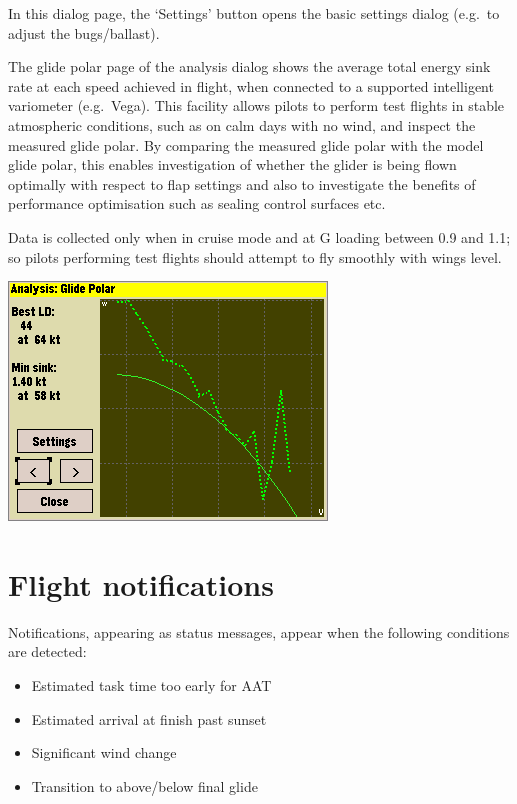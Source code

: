 \documentclass[a4paper,12pt]{refrep}
\begin{document}
In this dialog page, the `Settings' button opens the basic settings
dialog (e.g.\ to adjust the bugs/ballast).

The glide polar page of the analysis dialog shows the average total
energy sink rate at each speed achieved in flight, when connected to a
supported intelligent variometer (e.g.\ Vega).  This facility allows
pilots to perform test flights in stable atmospheric conditions, such
as on calm days with no wind, and inspect the measured glide polar.
By comparing the measured glide polar with the model glide polar, this
enables investigation of whether the glider is being flown optimally
with respect to flap settings and also to investigate the benefits of
performance optimisation such as sealing control surfaces etc.

Data is collected only when in cruise mode and at G loading between
0.9 and 1.1; so pilots performing test flights should attempt to fly
smoothly with wings level.

\begin{center}
\includegraphics[angle=0,width=\linewidth,keepaspectratio='true']{figures/shot-glidepolar.png}
\end{center}

\section{Flight notifications}

 Notifications, appearing as status messages, appear when the
 following conditions are detected: 
\begin{itemize}
\item Estimated task time too early for
 AAT 
\item Estimated arrival at finish past sunset
\item Significant wind change
\item Transition to above/below final glide
\end{itemize}
\end{document}
